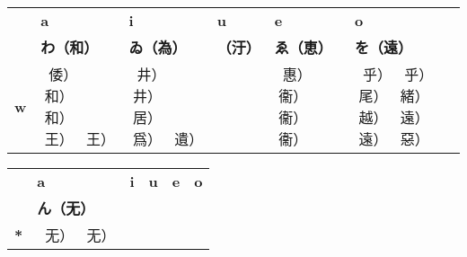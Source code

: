 \begin{center}
\begin{tabular}{m{1.0cm}||m{2.5cm}|m{2.5cm}|m{2.5cm}|m{2.5cm}|m{2.5cm}|}
& \textbf{a}& \textbf{i}& \textbf{u}& \textbf{e}& \textbf{o}\\
& \textbf{わ（和）}& \textbf{ゐ（為）}& \textbf{（汙）}& \textbf{ゑ（恵）}& \textbf{を（遠）}\\ \hline \hline
\textbf{w}&\smallskip 𛄈（倭） 𛄉（和） 𛄊（和） 𛄋（王） 𛄌（王）
          &\smallskip 𛄍（井） 𛄎（井） 𛄏（居） 𛄐（爲） 𛄑（遺）
          &\smallskip
          &\smallskip 𛄒（惠） 𛄓（衞） 𛄔（衞） 𛄕（衞）
          &\smallskip 𛄖（乎） 𛄗（乎） 𛄘（尾） 𛄙（緒） 𛄚（越） 𛄛（遠） 𛄜（遠） 𛀅（惡） \\ \hline
\end{tabular}


\begin{tabular}{m{1.0cm}||m{2.5cm}|m{2.5cm}|m{2.5cm}|m{2.5cm}|m{2.5cm}|}
& \textbf{a}& \textbf{i}& \textbf{u}& \textbf{e}& \textbf{o}\\
& \textbf{ん（无）}& \textbf{}& \textbf{}& \textbf{}& \textbf{}\\ \hline \hline
\textbf{*}&\smallskip 𛄝（无） 𛄞（无）
          &\smallskip
          &\smallskip
          &\smallskip
          &\smallskip   \\ \hline
\end{tabular}
\end{center}
